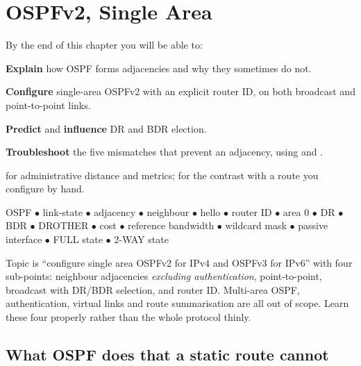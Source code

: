 \chapter{OSPFv2, Single Area}\label{ch:ospfv2}

\begin{outcomes}
By the end of this chapter you will be able to:
\begin{tight}
  \item \textbf{Explain} how OSPF forms adjacencies and why they sometimes do not.
  \item \textbf{Configure} single-area OSPFv2 with an explicit router ID, on both
        broadcast and point-to-point links.
  \item \textbf{Predict} and \textbf{influence} DR and BDR election.
  \item \textbf{Troubleshoot} the five mismatches that prevent an adjacency, using
         and .
\end{tight}
\end{outcomes}

\begin{prereq}
 for administrative distance and metrics;  for
the contrast with a route you configure by hand.
\end{prereq}

\begin{keyterms}
OSPF $\bullet$ link-state $\bullet$ adjacency $\bullet$ neighbour $\bullet$
hello $\bullet$ router ID $\bullet$ area 0 $\bullet$ DR $\bullet$ BDR $\bullet$
DROTHER $\bullet$ cost $\bullet$ reference bandwidth $\bullet$ wildcard mask
$\bullet$ passive interface $\bullet$ FULL state $\bullet$ 2-WAY state
\end{keyterms}

\begin{examnote}
Topic  is ``configure single area OSPFv2 for IPv4 and OSPFv3 for IPv6''
with four sub-points: neighbour adjacencies \emph{excluding authentication},
point-to-point, broadcast with DR/BDR selection, and router ID. Multi-area OSPF,
authentication, virtual links and route summarisation are all out of scope. Learn
these four properly rather than the whole protocol thinly.
\end{examnote}

\section{What OSPF does that a static route cannot}

